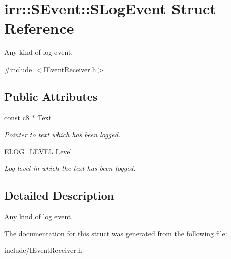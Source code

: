\hypertarget{structirr_1_1SEvent_1_1SLogEvent}{}\section{irr\+:\+:S\+Event\+:\+:S\+Log\+Event Struct Reference}
\label{structirr_1_1SEvent_1_1SLogEvent}


Any kind of log event.  




{\ttfamily \#include $<$I\+Event\+Receiver.\+h$>$}

\subsection*{Public Attributes}
\begin{DoxyCompactItemize}
\item 
const \hyperlink{namespaceirr_a9395eaea339bcb546b319e9c96bf7410}{c8} $\ast$ \hyperlink{structirr_1_1SEvent_1_1SLogEvent_a50bdc3d9e7cc7b4780bba2b321b5117d}{Text}\hypertarget{structirr_1_1SEvent_1_1SLogEvent_a50bdc3d9e7cc7b4780bba2b321b5117d}{}\label{structirr_1_1SEvent_1_1SLogEvent_a50bdc3d9e7cc7b4780bba2b321b5117d}

\begin{DoxyCompactList}\small\item\em Pointer to text which has been logged. \end{DoxyCompactList}\item 
\hyperlink{namespaceirr_aa2d1cac68606a25ed24cfffccfa30a92}{E\+L\+O\+G\+\_\+\+L\+E\+V\+EL} \hyperlink{structirr_1_1SEvent_1_1SLogEvent_aeb9088d42b7445ac43558e4fe5319db6}{Level}\hypertarget{structirr_1_1SEvent_1_1SLogEvent_aeb9088d42b7445ac43558e4fe5319db6}{}\label{structirr_1_1SEvent_1_1SLogEvent_aeb9088d42b7445ac43558e4fe5319db6}

\begin{DoxyCompactList}\small\item\em Log level in which the text has been logged. \end{DoxyCompactList}\end{DoxyCompactItemize}


\subsection{Detailed Description}
Any kind of log event. 

The documentation for this struct was generated from the following file\+:\begin{DoxyCompactItemize}
\item 
include/I\+Event\+Receiver.\+h\end{DoxyCompactItemize}
